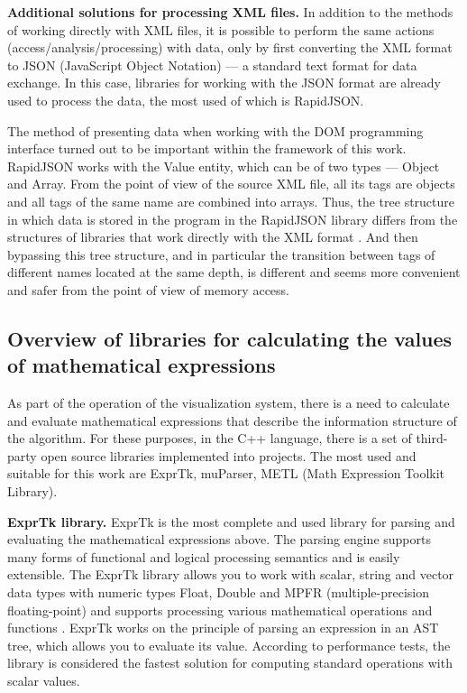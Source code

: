 \textbf{Additional solutions for processing XML files.} In addition to the methods of working directly with XML files, it is possible to perform the same actions (access/analysis/processing) with data, only by first converting the XML format to JSON (JavaScript Object Notation) --- a standard text format for data exchange. In this case, libraries for working with the JSON format are already used to process the data, the most used of which is RapidJSON.

The method of presenting data when working with the DOM programming interface turned out to be important within the framework of this work. RapidJSON works with the Value entity, which can be of two types --- Object and Array. From the point of view of the source XML file, all its tags are objects and all tags of the same name are combined into arrays. Thus, the tree structure in which data is stored in the program in the RapidJSON library differs from the structures of libraries that work directly with the XML format \cite{m15}. And then bypassing this tree structure, and in particular the transition between tags of different names located at the same depth, is different and seems more convenient and safer from the point of view of memory access.

\subsection{Overview of libraries for calculating the values of mathematical expressions}

As part of the operation of the visualization system, there is a need to calculate and evaluate mathematical expressions that describe the information structure of the algorithm. For these purposes, in the C++ language, there is a set of third-party open source libraries implemented into projects. The most used and suitable for this work are ExprTk, muParser, METL (Math Expression Toolkit Library).

\textbf{ExprTk library.} ExprTk is the most complete and used library for parsing and evaluating the mathematical expressions above. The parsing engine supports many forms of functional and logical processing semantics and is easily extensible. The ExprTk library allows you to work with scalar, string and vector data types with numeric types Float, Double and MPFR (multiple-precision floating-point) and supports processing various mathematical operations and functions \cite{m17}. ExprTk works on the principle of parsing an expression in an AST tree, which allows you to evaluate its value. According to performance tests, the library is considered the fastest solution for computing standard operations with scalar values.

